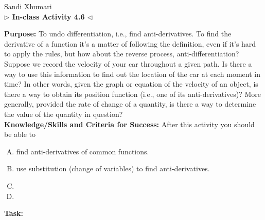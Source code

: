 \documentclass[answers]{exam}
\begin{document}
	\begin{center}
	\hfill Sandi Xhumari \\ \textbf{$\triangleright$ In-class Activity 4.6 $\triangleleft$}\\
\end{center}

\textbf{Purpose:} To undo differentiation, i.e., find anti-derivatives. To find the derivative of a function it's a matter of following the definition, even if it's hard to apply the rules, but how about the reverse process, anti-differentiation? Suppose we record the velocity of your car throughout a given path. Is there a way to use this information to find out the location of the car at each moment in time? In other words, given the graph or equation of the velocity of an object, is there a way to obtain its position function (i.e., one of its anti-derivatives)? More generally, provided the rate of change of a quantity, is there a way to determine the value of the quantity in question? \\

\textbf{Knowledge/Skills and Criteria for Success:} After this activity you should be able to

\begin{enumerate}[A.]
	\item find anti-derivatives of common functions. 
	\item use substitution (change of variables) to find anti-derivatives. 
	\item 
	\item 
	
\end{enumerate}

\textbf{Task:}
\end{document}

